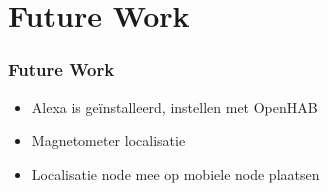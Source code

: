 \section{Future Work}

\begin{frame} 
\frametitle{Future Work}
  \begin{itemize}
  \item Alexa is ge\"{i}nstalleerd, instellen met OpenHAB
  \item Magnetometer localisatie
  \item Localisatie node mee op mobiele node plaatsen
  \end{itemize}
\end{frame}


